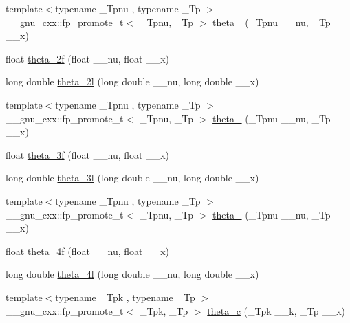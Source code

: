 \begin{DoxyCompactItemize}
\item 
{\footnotesize template$<$typename \+\_\+\+Tpnu , typename \+\_\+\+Tp $>$ }\\\+\_\+\+\_\+gnu\+\_\+cxx\+::fp\+\_\+promote\+\_\+t$<$ \+\_\+\+Tpnu, \+\_\+\+Tp $>$ \hyperlink{group__gnu__math__spec__func_ga16f278edeb2842d614bae1f1ae2d0256}{theta\+\_} (\+\_\+\+Tpnu \+\_\+\+\_\+nu, \+\_\+\+Tp \+\_\+\+\_\+x)
\item 
float \hyperlink{group__gnu__math__spec__func_ga78e832796aedf5159b142801e1184392}{theta\+\_\+2f} (float \+\_\+\+\_\+nu, float \+\_\+\+\_\+x)
\item 
long double \hyperlink{group__gnu__math__spec__func_gac5a30c772d4888442665945e7f3fa017}{theta\+\_\+2l} (long double \+\_\+\+\_\+nu, long double \+\_\+\+\_\+x)
\item 
{\footnotesize template$<$typename \+\_\+\+Tpnu , typename \+\_\+\+Tp $>$ }\\\+\_\+\+\_\+gnu\+\_\+cxx\+::fp\+\_\+promote\+\_\+t$<$ \+\_\+\+Tpnu, \+\_\+\+Tp $>$ \hyperlink{group__gnu__math__spec__func_ga146c3b8e86991e164d4bf143cda5f0fc}{theta\+\_} (\+\_\+\+Tpnu \+\_\+\+\_\+nu, \+\_\+\+Tp \+\_\+\+\_\+x)
\item 
float \hyperlink{group__gnu__math__spec__func_ga9a7c967d2a456f1a6aceee9a53f024b1}{theta\+\_\+3f} (float \+\_\+\+\_\+nu, float \+\_\+\+\_\+x)
\item 
long double \hyperlink{group__gnu__math__spec__func_gaf88874ff6c69940d2191f7947d2ea119}{theta\+\_\+3l} (long double \+\_\+\+\_\+nu, long double \+\_\+\+\_\+x)
\item 
{\footnotesize template$<$typename \+\_\+\+Tpnu , typename \+\_\+\+Tp $>$ }\\\+\_\+\+\_\+gnu\+\_\+cxx\+::fp\+\_\+promote\+\_\+t$<$ \+\_\+\+Tpnu, \+\_\+\+Tp $>$ \hyperlink{group__gnu__math__spec__func_ga8a6f8b69272a9f205a13e1745832ada3}{theta\+\_} (\+\_\+\+Tpnu \+\_\+\+\_\+nu, \+\_\+\+Tp \+\_\+\+\_\+x)
\item 
float \hyperlink{group__gnu__math__spec__func_ga0c5cbf87e304844ed4c3423be5ca09a5}{theta\+\_\+4f} (float \+\_\+\+\_\+nu, float \+\_\+\+\_\+x)
\item 
long double \hyperlink{group__gnu__math__spec__func_gaaf63a80e90cdcdd66ebb18cd3a84afae}{theta\+\_\+4l} (long double \+\_\+\+\_\+nu, long double \+\_\+\+\_\+x)
\item 
{\footnotesize template$<$typename \+\_\+\+Tpk , typename \+\_\+\+Tp $>$ }\\\+\_\+\+\_\+gnu\+\_\+cxx\+::fp\+\_\+promote\+\_\+t$<$ \+\_\+\+Tpk, \+\_\+\+Tp $>$ \hyperlink{group__gnu__math__spec__func_ga3ebbb6513c39e1d55b08cba7d169ce3d}{theta\+\_\+c} (\+\_\+\+Tpk \+\_\+\+\_\+k, \+\_\+\+Tp \+\_\+\+\_\+x)

\end{DoxyCompactItemize}
